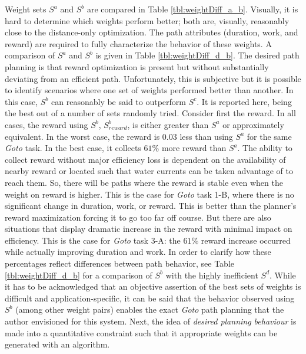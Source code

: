 \documentclass{tamuccthesis}
\begin{document}
Weight sets $S^a$ and $S^b$ are compared in Table \ref{tbl:weightDiff_a_b}. Visually, it is hard to determine which weights perform better; both are, visually, reasonably close to the distance-only optimization. The path attributes (duration, work, and reward) are required to fully characterize the behavior of these weights. A comparison of $S^a$ and $S^b$ is given in Table \ref{tbl:weightDiff_d_b}. The desired path planning is that reward optimization is present but without substantially deviating from an efficient path. Unfortunately, this is subjective but it is possible to identify scenarios where one set of weights performed better than another. In this case, $S^b$ can reasonably be said to outperform $S^c$. It is reported here, being the best out of a number of sets randomly tried. Consider first the reward. In all cases, the reward using $S^b$, $S^b_{reward}$, is either greater than $S^a$ or approximately equivalent. In the worst case, the reward is 0.03 less than using $S^a$ for the same \textit{Goto} task. In the best case, it collects $61\%$ more reward than $S^a$. The ability to collect reward without major efficiency loss is dependent on the availability of nearby reward or located such that water currents can be taken advantage of to reach them. So, there will be paths where the reward is stable even when the weight on reward is higher. This is the case for \textit{Goto} task 1-B, where there is no significant change in duration, work, or reward. This is better than the planner's reward maximization forcing it to go too far off course. But there are also situations that display dramatic increase in the reward with minimal impact on efficiency. This is the case for \textit{Goto} task 3-A: the $61\%$ reward increase occurred while actually improving duration and work. In order to clarify how these percentages reflect differences between path behavior, see Table \ref{tbl:weightDiff_d_b} for a comparison of $S^b$ with the highly inefficient $S^d$. While it has to be acknowledged that an objective assertion of the best sets of weights is difficult and application-specific, it can be said that the behavior observed using $S^b$ (among other weight pairs) enables the exact \textit{Goto} path planning that the author envisioned for this system. Next, the idea of \textit{desired planning behaviour} is made into a quantitative constraint such that it appropriate weights can be generated with an algorithm.
\end{document}
